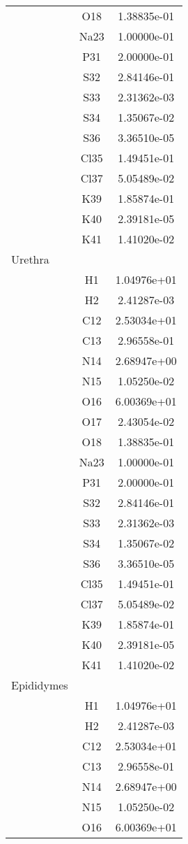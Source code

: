 \begin{centering}
\begin{longtable}{l c c}
& O18 & 1.38835e-01 \\ 
& Na23 & 1.00000e-01 \\ 
& P31 & 2.00000e-01 \\ 
& S32 & 2.84146e-01 \\ 
& S33 & 2.31362e-03 \\ 
& S34 & 1.35067e-02 \\ 
& S36 & 3.36510e-05 \\ 
& Cl35 & 1.49451e-01 \\ 
& Cl37 & 5.05489e-02 \\ 
& K39 & 1.85874e-01 \\ 
& K40 & 2.39181e-05 \\ 
& K41 & 1.41020e-02 \\ 
\hline
Urethra & & \\
\hline
& H1 & 1.04976e+01 \\ 
& H2 & 2.41287e-03 \\ 
& C12 & 2.53034e+01 \\ 
& C13 & 2.96558e-01 \\ 
& N14 & 2.68947e+00 \\ 
& N15 & 1.05250e-02 \\ 
& O16 & 6.00369e+01 \\ 
& O17 & 2.43054e-02 \\ 
& O18 & 1.38835e-01 \\ 
& Na23 & 1.00000e-01 \\ 
& P31 & 2.00000e-01 \\ 
& S32 & 2.84146e-01 \\ 
& S33 & 2.31362e-03 \\ 
& S34 & 1.35067e-02 \\ 
& S36 & 3.36510e-05 \\ 
& Cl35 & 1.49451e-01 \\ 
& Cl37 & 5.05489e-02 \\ 
& K39 & 1.85874e-01 \\ 
& K40 & 2.39181e-05 \\ 
& K41 & 1.41020e-02 \\ 
\hline
Epididymes & & \\
\hline
& H1 & 1.04976e+01 \\ 
& H2 & 2.41287e-03 \\ 
& C12 & 2.53034e+01 \\ 
& C13 & 2.96558e-01 \\ 
& N14 & 2.68947e+00 \\ 
& N15 & 1.05250e-02 \\ 
& O16 & 6.00369e+01 \\ 

\end{longtable}
\end{centering}
